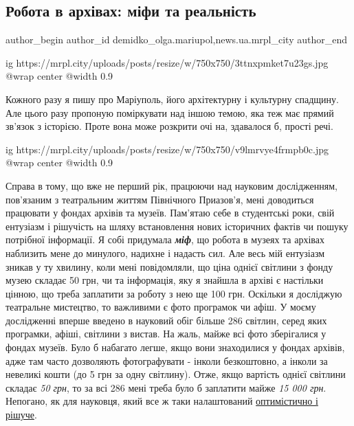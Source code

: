  
 
 
 
 
 
\subsection{Робота в архівах: міфи та реальність}
\label{sec:18_07_2018.stz.news.ua.mrpl_city.1.robota_v_arhivah_mify_ta_realnist}
 
\ifcmt
 author_begin
   author_id demidko_olga.mariupol,news.ua.mrpl_city
 author_end
\fi


\ifcmt
  ig https://mrpl.city/uploads/posts/resize/w/750x750/3ttnxpmket7u23gs.jpg
  @wrap center
  @width 0.9
\fi

Кожного разу я пишу про Маріуполь, його архітектурну і культурну спадщину. Але
цього разу пропоную поміркувати над іншою темою, яка теж має прямий зв'язок з
історією. Проте вона може розкрити очі на, здавалося б, прості речі.

\ifcmt
  ig https://mrpl.city/uploads/posts/resize/w/750x750/v9lmrvye4frmpb0c.jpg
  @wrap center
  @width 0.9
\fi

Справа в тому, що вже не перший рік, працюючи над науковим дослідженням,
пов'язаним з театральним життям Північного Приазов'я, мені доводиться працювати
у фондах архівів та музеїв. Пам'ятаю себе в студентські роки, свій ентузіазм і
рішучість на шляху встановлення нових історичних фактів чи пошуку потрібної
інформації. Я собі придумала \textbf{\em міф}, що робота в музеях та архівах наблизить мене
до минулого, надихне і надасть сил. Але весь мій ентузіазм зникав у ту хвилину,
коли мені повідомляли, що ціна однієї світлини з фонду музею складає 50 грн, чи
та інформація, яку я знайшла в архіві є настільки цінною, що треба заплатити за
роботу з нею ще 100 грн. Оскільки я досліджую театральне мистецтво, то
важливими є фото програмок чи афіш. У моєму дослідженні вперше введено в
науковий обіг більше 286 світлин, серед яких програмки, афіші, світлини з
вистав. На жаль, майже всі фото зберігалися у фондах музеїв. Було б набагато
легше, якщо вони знаходилися у фондах архівів, адже там часто дозволяють
фотографувати - інколи безкоштовно, а інколи за невеликі кошти (до 5 грн за
одну світлину). Отже, якщо вартість однієї світлини складає \emph{50 грн}, то за всі
286 мені треба було б заплатити майже \emph{15 000 грн}. Непогано, як для науковця,
який все ж таки налаштований \underline{оптимістично і рішуче}.


